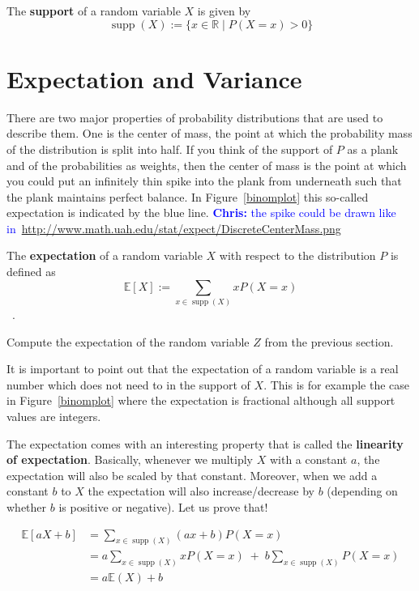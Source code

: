 \documentclass[a4paper,11pt,leqno]{report}
\newcommand{\chris}[1]{ \textcolor{blue}{\textbf{Chris:} #1}}
\newcommand{\supp}{\operatorname{supp}}
\newcommand{\E}{\mathbb{E}}
\begin{document}
\begin{Definition}
The \textbf{support} of a random variable $ X $ is given by
$$ \supp(X) := \{x \in \mathbb{R} \mid P(X=x)>0 \} $$
\end{Definition}




\section{Expectation and Variance}

There are two major properties of probability distributions that are used to describe them. One is the center of mass, the point
at which the probability mass of the distribution is split into half. If you think of the support of $ P $ as a plank and 
of the probabilities as weights, then the center of mass is the point at which you could put an infinitely thin spike into the
plank from underneath such that the plank maintains perfect balance. In Figure~\ref{binomplot} this so-called expectation
is indicated by the blue line. \chris{the spike could be drawn like in~\url{http://www.math.uah.edu/stat/expect/DiscreteCenterMass.png}}

\begin{Definition}[Expectation]
The \textbf{expectation} of a random variable $ X $ with respect to the distribution $ P $ is defined as
$$ \E[X] := \sum_{x \in \supp(X)} x P(X=x) $$ \, .
\end{Definition}

\begin{Exercise}
Compute the expectation of the random variable $ Z $ from the previous section.
\end{Exercise}

It is important to point out that the expectation of a random variable is a real number  which does not need to in the support of $ X $. This is for example the case in Figure~\ref{binomplot} where the
expectation is fractional although all support values are integers.

The expectation comes with an interesting property that is called the \textbf{linearity of expectation}. Basically, whenever we multiply $ X $ with a constant $ a $, the expectation will also be scaled by that constant. Moreover, when we add a constant $ b $
to $ X $ the expectation will also increase/decrease by $ b $ (depending on whether $ b $ is positive or negative). Let us
prove that!

\begin{align}
\E[aX+b] &= \sum_{x \in \supp(X)} (ax+b) P(X=x) \\
&= a \!\! \sum_{x \in \supp(X)} x P(X=x) \; + \; b \!\!\!\! \sum_{x \in \supp(X)} P(X=x)\\
&= a \E(X) + b \label{sumToOne}
\end{align}
\end{document}
